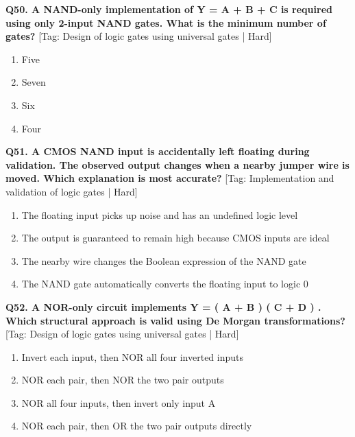 \noindent\textbf{Q50. A NAND-only implementation of Y = A + B + C is required using only 2-input NAND gates. What is the minimum number of gates?} \hfill [Tag: Design of logic gates using universal gates | Hard]
\begin{enumerate}[label=(\alph*),topsep=2pt,itemsep=1pt,partopsep=0pt,parsep=0pt]
    \item {Five}
    \item {Seven}
    \item {Six}
    \item {Four}
\end{enumerate}
\vspace{2mm}

\noindent\textbf{Q51. A CMOS NAND input is accidentally left floating during validation. The observed output changes when a nearby jumper wire is moved. Which explanation is most accurate?} \hfill [Tag: Implementation and validation of logic gates | Hard]
\begin{enumerate}[label=(\alph*),topsep=2pt,itemsep=1pt,partopsep=0pt,parsep=0pt]
    \item {The floating input picks up noise and has an undefined logic level}
    \item {The output is guaranteed to remain high because CMOS inputs are ideal}
    \item {The nearby wire changes the Boolean expression of the NAND gate}
    \item {The NAND gate automatically converts the floating input to logic 0}
\end{enumerate}
\vspace{2mm}

\noindent\textbf{Q52. A NOR-only circuit implements Y = ( A + B ) ( C + D ) . Which structural approach is valid using De Morgan transformations?} \hfill [Tag: Design of logic gates using universal gates | Hard]
\begin{enumerate}[label=(\alph*),topsep=2pt,itemsep=1pt,partopsep=0pt,parsep=0pt]
    \item {Invert each input, then NOR all four inverted inputs}
    \item {NOR each pair, then NOR the two pair outputs}
    \item {NOR all four inputs, then invert only input A}
    \item {NOR each pair, then OR the two pair outputs directly}
\end{enumerate}
\vspace{2mm}

